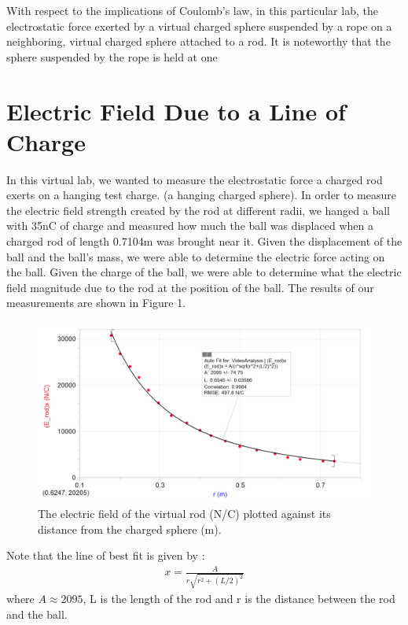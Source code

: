 \documentclass[oneside,12pt]{amsart}
\begin{document}
	\indent With respect to the implications of Coulomb’s law, in this particular lab, the electrostatic force exerted by a virtual charged sphere suspended by a rope  on a neighboring, virtual charged sphere attached to a rod. It is noteworthy that the sphere suspended by the rope is held at one 
	\section{Electric Field Due to a Line of Charge}
	\indent In this virtual lab, we wanted to measure the electrostatic force a charged rod exerts on a hanging test charge. (a hanging charged sphere). In order to measure the electric field strength created by the rod at different radii, we hanged a ball with 35nC of charge and measured how much the ball was displaced when a charged rod of length 0.7104m was brought near it. Given the displacement of the ball and the ball's mass, we were able to determine the electric force acting on the ball. Given the charge of the ball, we were able to determine what the electric field magnitude due to the rod at the position of the ball. The results of our measurements are shown in Figure 1.\\
	
	\begin{figure}[h]
		\includegraphics[width=\medgraph,scale=0.01]{FieldStrength.png}
		\caption{The electric field of the virtual rod (N/C) plotted against its distance from the charged sphere (m). 
		}
		\label{Fld}
	\end{figure}
	
	\indent Note that the line of best fit is given by :
	\begin{align*}
	x=\frac{A}{r\sqrt{r^2+(L/2)^2}	}
	\end{align*}
	where $A\approx 2095$, L is the length of the rod and r is the distance between the rod and the ball.
	
\end{document}
